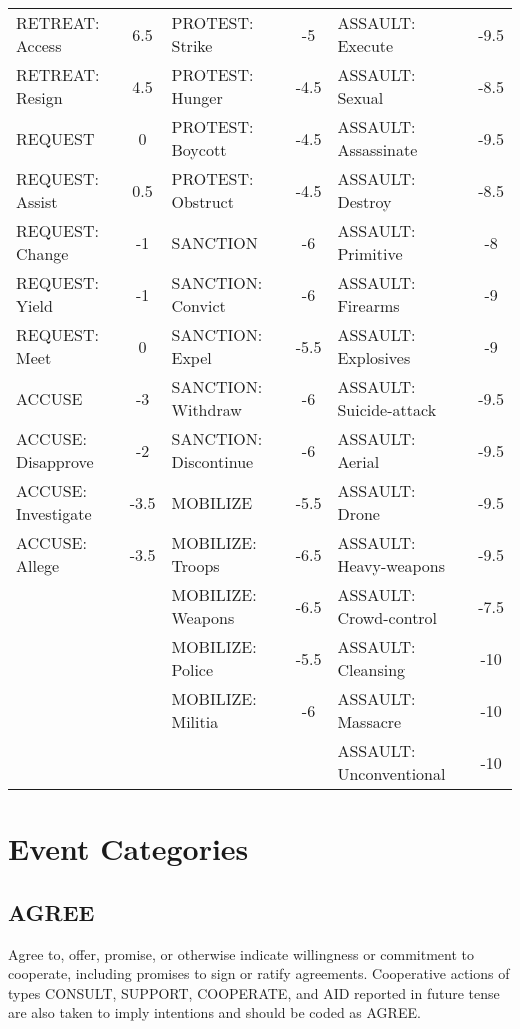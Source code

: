 \documentclass[11pt]{report}
\newcommand{\plcat}[1]{\textsf{#1}}
\begin{document}
\begin{table}[htp]
\begin{center}
\begin{tabular}{|lc|lc|lc|}
RETREAT: Access	&	6.5	&	PROTEST: Strike	&	-5	&	ASSAULT: Execute	&	-9.5 \\
RETREAT: Resign	&	4.5	&	PROTEST: Hunger	&	-4.5	&	ASSAULT: Sexual	&	-8.5 \\
\cellcolor{gray!25}REQUEST	&	\cellcolor{gray!25}0	&	PROTEST: Boycott	&	-4.5	&	ASSAULT: Assassinate	&	-9.5 \\
REQUEST: Assist	&	0.5	&	PROTEST: Obstruct	&	-4.5	&	ASSAULT: Destroy	&	-8.5 \\
REQUEST: Change	&	-1	&	\cellcolor{gray!25}SANCTION	&	\cellcolor{gray!25}-6	&	ASSAULT: Primitive	&	-8 \\
REQUEST: Yield	&	-1	&	SANCTION: Convict	&	-6	&	ASSAULT: Firearms	&	-9 \\
REQUEST: Meet	&	0	&	SANCTION: Expel	&	-5.5	&	ASSAULT: Explosives	&	-9 \\
\cellcolor{gray!25}ACCUSE	&	\cellcolor{gray!25}-3	&	SANCTION: Withdraw	&	-6	&	ASSAULT: Suicide-attack	&	-9.5 \\
ACCUSE: Disapprove	&	-2	&	SANCTION: Discontinue	&	-6	&	ASSAULT: Aerial	&	-9.5 \\
ACCUSE: Investigate	&	-3.5	&	\cellcolor{gray!25}MOBILIZE	&	\cellcolor{gray!25}-5.5	&	ASSAULT: Drone	&	-9.5 \\
ACCUSE: Allege	&	-3.5	&	MOBILIZE: Troops	&	-6.5	&	ASSAULT: Heavy-weapons	&	-9.5 \\
	&		&	MOBILIZE: Weapons	&	-6.5	&	ASSAULT: Crowd-control	&	-7.5 \\
	&		&	MOBILIZE: Police	&	-5.5	&	ASSAULT: Cleansing	&	-10 \\
	&		&	MOBILIZE: Militia	&	-6	&	ASSAULT: Massacre	&	-10 \\
	&		&		&		&	ASSAULT: Unconventional	&	-10 \\
\hline
\end{tabular}
\end{center}
\label{tab:ploverscores}
\end{table}

\chapter{Event Categories}

\section{AGREE}


Agree to, offer, promise, or otherwise indicate willingness or commitment to cooperate, including promises to sign or ratify agreements.  Cooperative actions of types \plcat{CONSULT}, \plcat{SUPPORT}, \plcat{COOPERATE}, and \plcat{AID} reported in future tense are also taken to imply intentions and should be coded as \plcat{AGREE}.
\end{document}
